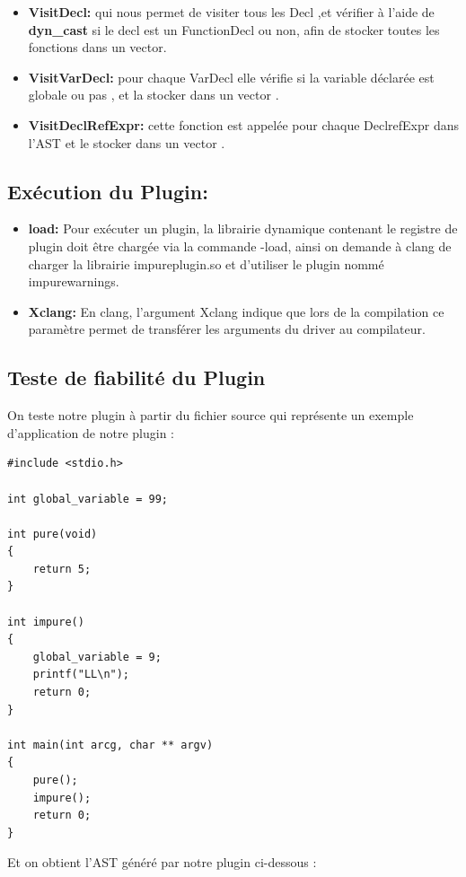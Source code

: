 \documentclass[12pt,a4paper]{article}
\begin{document}
\begin{itemize}
\item  \textbf{VisitDecl:} qui nous permet de visiter tous les Decl ,et vérifier à l’aide de \textbf{ dyn\_cast} si le decl est un FunctionDecl ou non, afin de stocker toutes les fonctions dans  un vector.
\item \textbf{VisitVarDecl:} pour chaque VarDecl elle vérifie si la variable déclarée est globale ou pas , et la stocker dans un vector .
\item \textbf{VisitDeclRefExpr:} cette fonction est appelée pour chaque DeclrefExpr dans l’AST et le stocker dans un vector .
\end{itemize}

\subsection{ Exécution du Plugin:}

\begin{itemize}
    \item \textbf{load:}
Pour exécuter un plugin, la librairie dynamique contenant le registre de plugin doit être chargée via la commande -load, ainsi on demande à clang de charger la librairie impureplugin.so et d'utiliser le plugin nommé impurewarnings.
\item \textbf{ Xclang:}
En clang, l'argument Xclang indique que lors de la compilation ce paramètre permet de transférer les arguments du driver au compilateur.
\end{itemize}
\subsection{Teste de fiabilité du Plugin}
On teste notre plugin à partir du fichier source qui représente un exemple d'application de notre plugin : 

\begin{lstlisting}
#include <stdio.h>

int global_variable = 99;

int pure(void)
{
	return 5;
}

int impure()
{	
	global_variable = 9;
	printf("LL\n");
	return 0;
}

int main(int arcg, char ** argv)
{
	pure();
	impure();
	return 0;
}
\end{lstlisting}

Et on obtient l'AST généré par notre plugin ci-dessous :
\end{document}
